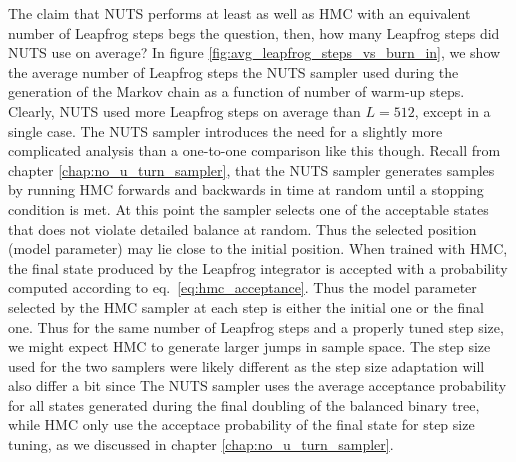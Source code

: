 The claim that NUTS performs at least as well as HMC with an equivalent number of Leapfrog steps begs the question, then, how many Leapfrog steps did NUTS use on average? In figure \ref{fig:avg_leapfrog_steps_vs_burn_in}, we show the average number of Leapfrog steps the NUTS sampler used during the generation of the Markov chain as a function of number of warm-up steps. Clearly, NUTS used more Leapfrog steps on average than $L = 512$, except in a single case. The NUTS sampler introduces the need for a slightly more complicated analysis than a one-to-one comparison like this though. Recall from chapter \ref{chap:no_u_turn_sampler}, that the NUTS sampler generates samples by running HMC forwards and backwards in time at random until a stopping condition is met. At this point the sampler selects one of the acceptable states that does not violate detailed balance at random. Thus the selected position (model parameter) may lie close to the initial position.
When trained with HMC, the final state produced by the Leapfrog integrator is accepted with a probability computed according to eq.~\eqref{eq:hmc_acceptance}. Thus the model parameter selected by the HMC sampler at each step is either the initial one or the final one. Thus for the same number of Leapfrog steps and a properly tuned step size, we might expect HMC to generate larger jumps in sample space. The step size used for the two samplers were likely different as the step size adaptation will also differ a bit since The NUTS sampler uses the average acceptance probability for all states generated during the final doubling of the balanced binary tree, while HMC only use the acceptace probability of the final state for step size tuning, as we discussed in chapter \ref{chap:no_u_turn_sampler}.

